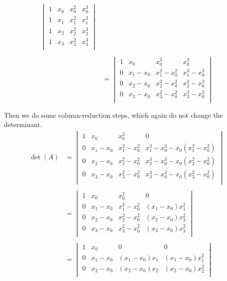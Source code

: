 \documentclass{report}
\begin{document}
\begin{itemize}
$$\begin{align}
\begin{vmatrix}
    1 & x_0 & x_0^2 & x_0^3\\
    1 & x_1 & x_1^2 & x_1^3\\
    1 & x_2 & x_2^2 & x_2^3\\
    1 & x_3 & x_3^2 & x_3^3\\
\end{vmatrix} \\ \\
& = 
\begin{vmatrix}
    1 & x_0 & x_0^2 & x_0^3\\
    0 & x_1-x_0 & x_1^2-x_0^2 & x_1^3-x_0^3\\
    0 & x_2-x_0 & x_2^2-x_0^2 & x_2^3-x_0^3\\
    0 & x_3-x_0 & x_3^2-x_0^2 & x_3^3-x_0^3\\
\end{vmatrix} \\ \\
    \end{align}
    $$
    \bigbreak \noindent 
    Then we do some column-reduction steps, which again do not change the determinant.
    $$
    \begin{align}
        \det(A)
& = 
\begin{vmatrix}
    1 & x_0 & x_0^2 & 0 \\
    0 & x_1-x_0 & x_1^2-x_0^2 & x_1^3-x_0^3 - x_0(x_1^2-x_0^2)\\
    0 & x_2-x_0 & x_2^2-x_0^2 & x_2^3-x_0^3 - x_0(x_2^2-x_0^2)\\
    0 & x_3-x_0 & x_3^2-x_0^2 & x_3^3-x_0^3 - x_0(x_3^2-x_0^2)\\
\end{vmatrix} \\ \\
& = 
\begin{vmatrix}
    1 & x_0 & x_0^2 & 0 \\
    0 & x_1-x_0 & x_1^2-x_0^2 & (x_1 - x_0)x_1^2\\
    0 & x_2-x_0 & x_2^2-x_0^2 & (x_2 - x_0)x_2^2\\
    0 & x_3-x_0 & x_3^2-x_0^2 & (x_3 - x_0)x_3^2\\
\end{vmatrix} \\ \\
& = 
\begin{vmatrix}
    1 & x_0 & 0 & 0 \\
    0 & x_1-x_0 & (x_1 - x_0)x_1 & (x_1 - x_0)x_1^2\\
    0 & x_2-x_0 & (x_2 - x_0)x_2 & (x_2 - x_0)x_2^2\\

\end{vmatrix}
\end{align}$$
\end{itemize}
\end{document}
